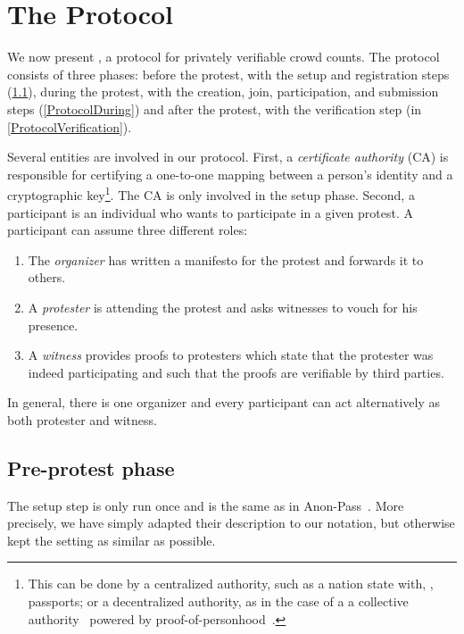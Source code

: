 \section{The \CROCUS Protocol}
\label{Protocol}


We now present \CROCUS, a protocol for privately verifiable crowd counts.
The protocol consists of three phases:
before the protest, with the setup and registration steps (\cref{ProtocolSetup}),
during the protest, with the creation, join, participation, and submission steps (\cref{ProtocolDuring})
and after the protest, with the verification step (in \cref{ProtocolVerification}).

Several entities are involved in our protocol.
First, a \emph{certificate authority} (\ac{CA}) is responsible for certifying a one-to-one mapping between a 
person's identity and a cryptographic key\footnote{%
  This can be done by a centralized authority, such as a nation state with, 
  \eg, passports; or a decentralized authority, as in the case of a a 
  collective authority~\cite{collective-signing} powered by 
  proof-of-personhood~\cite{proof-of-personhood}.
}.
The \ac{CA} is only involved in the setup phase.
Second, a participant is an individual who wants to participate in a given 
protest.
A participant can assume three different roles:
\begin{enumerate}
\item The \emph{organizer} has written a manifesto for the protest and forwards it to others.
\item A \emph{protester} is attending the protest and asks witnesses to vouch 
  for his presence.
\item A \emph{witness} provides proofs to protesters which state that the 
  protester was indeed participating and such that the proofs are verifiable by 
  third parties.
\end{enumerate}
In general, there is one organizer and every participant can act alternatively 
as both protester and witness.

\subsection{Pre-protest phase}%
\label{ProtocolSetup}

The setup step is only run once and is the same as in Anon-Pass~\cite{AnonPass}.
More precisely, we have simply adapted their description to our notation, but otherwise kept the setting as similar as possible.


